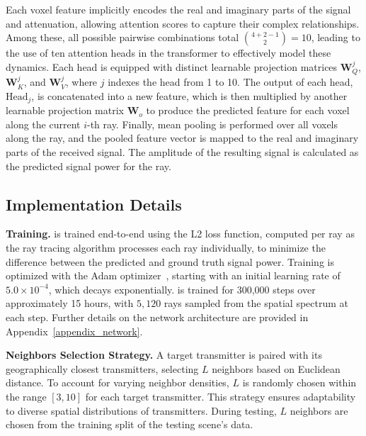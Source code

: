 Each voxel feature implicitly encodes the real and imaginary parts of the signal and attenuation, allowing attention scores to capture their complex relationships. 
Among these, all possible pairwise combinations total \( \binom{4 + 2 - 1}{2} = 10 \), leading to the use of ten attention heads in the transformer to effectively model these dynamics.
Each head is equipped with distinct learnable projection matrices \( \mathbf{W}_Q^j \), \( \mathbf{W}_K^j \), and \( \mathbf{W}_V^j \), where \( j \) indexes the head from 1 to 10. 
The output of each head, \( \text{Head}_j \), is concatenated into a new feature, which is then multiplied by another learnable projection matrix \( \mathbf{W}_o \) to produce the predicted feature for each voxel along the current \( i \)-th ray.
Finally, mean pooling is performed over all voxels along the ray, and the pooled feature vector is mapped to the real and imaginary parts of the received signal. 
The amplitude of the resulting signal is calculated as the predicted signal power for the ray.





\subsection{Implementation Details}

\textbf{Training.}  
\ourSystem is trained end-to-end using the L2 loss function, computed per ray as the ray tracing algorithm processes each ray individually, to minimize the difference between the predicted and ground truth signal power. 
Training is optimized with the Adam optimizer~\cite{kingma2014adam}, starting with an initial learning rate of $5.0 \times 10^{-4}$, which decays exponentially. 
\ourSystem is trained for 300,000 steps over approximately 15 hours, with \(5,120\) rays sampled from the spatial spectrum at each step. 
Further details on the network architecture are provided in Appendix~\ref{appendix_network}.




\textbf{Neighbors Selection Strategy.}
A target transmitter is paired with its geographically closest transmitters, selecting \( L \) neighbors based on Euclidean distance. 
To account for varying neighbor densities, \( L \) is randomly chosen within the range \([3, 10]\) for each target transmitter. 
This strategy ensures adaptability to diverse spatial distributions of transmitters. 
During testing, \( L \) neighbors are chosen from the training split of the testing scene's data.


